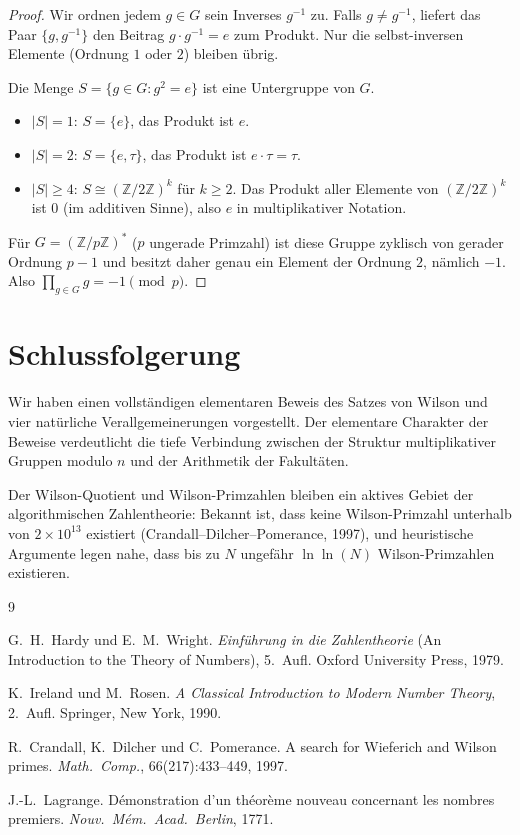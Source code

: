 \documentclass[12pt,a4paper]{amsart}
\theoremstyle{definition}
\newcommand{\Z}{\mathbb{Z}}
\begin{document}
\begin{proof}
  Wir ordnen jedem $g \in G$ sein Inverses $g^{-1}$ zu.
  Falls $g \neq g^{-1}$, liefert das Paar $\{g, g^{-1}\}$ den Beitrag
  $g \cdot g^{-1} = e$ zum Produkt.
  Nur die selbst-inversen Elemente (Ordnung $1$ oder $2$) bleiben übrig.

  Die Menge $S = \{g \in G : g^2 = e\}$ ist eine Untergruppe von $G$.
  \begin{itemize}
    \item $|S| = 1$: $S = \{e\}$, das Produkt ist $e$.
    \item $|S| = 2$: $S = \{e, \tau\}$, das Produkt ist $e \cdot \tau = \tau$.
    \item $|S| \geq 4$: $S \cong (\Z/2\Z)^k$ für $k \geq 2$.
      Das Produkt aller Elemente von $(\Z/2\Z)^k$ ist $0$ (im additiven Sinne),
      also $e$ in multiplikativer Notation.
  \end{itemize}
  Für $G = (\Z/p\Z)^*$ ($p$ ungerade Primzahl) ist diese Gruppe zyklisch von
  gerader Ordnung $p-1$ und besitzt daher genau ein Element der Ordnung $2$,
  nämlich $-1$.  Also $\prod_{g \in G} g = -1 \pmod{p}$. \qedhere
\end{proof}

\section{Schlussfolgerung}

Wir haben einen vollständigen elementaren Beweis des Satzes von Wilson und vier
natürliche Verallgemeinerungen vorgestellt.
Der elementare Charakter der Beweise verdeutlicht die tiefe Verbindung zwischen
der Struktur multiplikativer Gruppen modulo $n$ und der Arithmetik der Fakultäten.

Der Wilson-Quotient und Wilson-Primzahlen bleiben ein aktives Gebiet der
algorithmischen Zahlentheorie: Bekannt ist, dass keine Wilson-Primzahl
unterhalb von $2 \times 10^{13}$ existiert (Crandall--Dilcher--Pomerance, 1997),
und heuristische Argumente legen nahe, dass bis zu $N$ ungefähr $\ln\ln(N)$
Wilson-Primzahlen existieren.

\begin{thebibliography}{9}

G.~H.~Hardy und E.~M.~Wright.
\newblock \emph{Einführung in die Zahlentheorie} (An Introduction to the Theory of Numbers), 5.~Aufl.
\newblock Oxford University Press, 1979.

K.~Ireland und M.~Rosen.
\newblock \emph{A Classical Introduction to Modern Number Theory}, 2.~Aufl.
\newblock Springer, New York, 1990.

R.~Crandall, K.~Dilcher und C.~Pomerance.
\newblock A search for Wieferich and Wilson primes.
\newblock \emph{Math.\ Comp.}, 66(217):433--449, 1997.

J.-L.~Lagrange.
\newblock Démonstration d'un théorème nouveau concernant les nombres premiers.
\newblock \emph{Nouv.\ Mém.\ Acad.\ Berlin}, 1771.

\end{thebibliography}
\end{document}
